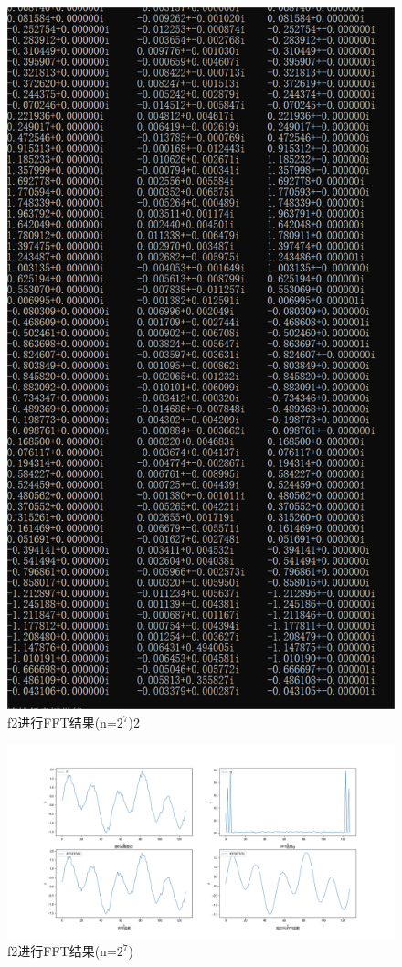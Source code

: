 \documentclass{article}
\begin{document}
\begin{figure}[!h]
	
	\centering
	\includegraphics[scale=0.4]{f2(2)}
	\caption{\heiti{}f2进行FFT结果(n=$ 2^7 $)2}
	
\end{figure}
	\begin{figure}[!h]
	
	\centering
	\includegraphics[scale=0.4]{f_2}
	\caption{\heiti{}f2进行FFT结果(n=$ 2^7 $)}
	\label{fig:6}
\end{figure}
\end{document}
